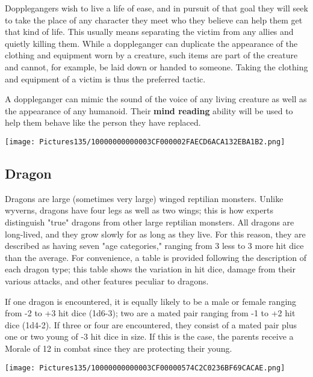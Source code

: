 \documentclass[a4paper,twoside,openany,10pt]{book}
\begin{document}
\begin{multicols}{2}
Dopplegangers wish to live a life of ease, and in pursuit of that goal they will seek to take the place of any character they meet who they believe can help them get that kind of life. This usually means separating the victim from any allies and quietly killing them. While a doppleganger can duplicate the appearance of the clothing and equipment worn by a creature, such items are part of the creature and cannot, for example, be laid down or handed to someone. Taking the clothing and equipment of a victim is thus the preferred tactic.

A doppleganger can mimic the sound of the voice of any living creature as well as the appearance of any humanoid. Their \textbf{mind reading} ability will be used to help them behave like the person they have replaced.


\begin{center}
	\texttt{[image: Pictures135/10000000000003CF000002FAECD6ACA132EBA1B2.png]}
\end{center}

\subsection*{Dragon}\label{dragon}

Dragons are large (sometimes very large) winged reptilian monsters. Unlike wyverns, dragons have four legs as well as two wings; this is how experts distinguish "true" dragons from other large reptilian monsters. All dragons are long-lived, and they grow slowly for as long as they live. For this reason, they are described as having seven "age categories," ranging from 3 less to 3 more hit dice than the average. For convenience, a table is provided following the description of each dragon type; this table shows the variation in hit dice, damage from their various attacks, and other features peculiar to dragons. 

If one dragon is encountered, it is equally likely to be a male or female ranging from -2 to +3 hit dice (1d6-3); two are a mated pair ranging from -1 to +2 hit dice (1d4-2). If three or four are encountered, they consist of a mated pair plus one or two young of -3 hit dice in size. If this is the case, the parents receive a Morale of 12 in combat since they are protecting their young.


\begin{center}
	\texttt{[image: Pictures135/10000000000003CF00000574C2C0236BF69CACAE.png]}
\end{center}


\end{multicols}
\end{document}
